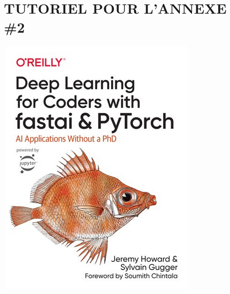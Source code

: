 \documentclass[12pt]{article} 	%
\makeatletter
\newif\ifnotes
\newcommand{\note}[1]{\@bsphack\ifnotes{#1}\fi\@esphack}
\makeatother
\begin{document}
\section{TUTORIEL POUR L'ANNEXE \#2}\label{appendix:fastbook}
\begin{center}
    \includegraphics[scale=1.3]{img/fastbook.png}
\end{center}

\newpage


\note{
\newpage


}
\end{document}
